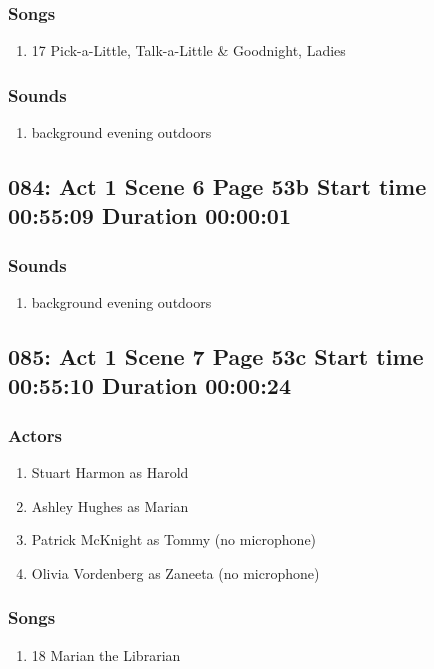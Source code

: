 \subsubsection{Songs}
\begin{enumerate}
\item 17 Pick-a-Little, Talk-a-Little \& Goodnight, Ladies
\end{enumerate}\subsubsection{Sounds}
\begin{enumerate}
\item background evening outdoors
\end{enumerate}
\subsection{084: Act 1 Scene 6 Page 53b Start time 00:55:09 Duration 00:00:01}
\subsubsection{Sounds}
\begin{enumerate}
\item background evening outdoors
\end{enumerate}
\subsection{085: Act 1 Scene 7 Page 53c Start time 00:55:10 Duration 00:00:24}

\subsubsection{Actors}
\begin{enumerate}
\item Stuart Harmon as Harold
\item Ashley Hughes as Marian
\item Patrick McKnight as Tommy (no microphone)
\item Olivia Vordenberg as Zaneeta (no microphone)
\end{enumerate}

\subsubsection{Songs}
\begin{enumerate}
\item 18 Marian the Librarian
\end{enumerate}

